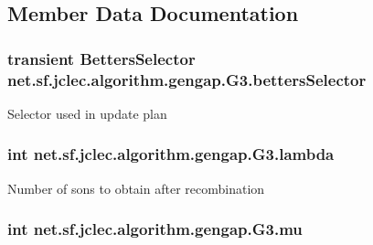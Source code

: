 \subsection{Member Data Documentation}
\hypertarget{classnet_1_1sf_1_1jclec_1_1algorithm_1_1gengap_1_1_g3_aeec51201a8db026697691e93b2c8b026}{
\subsubsection[{betters\-Selector}]{\setlength{\rightskip}{0pt plus 5cm}transient {\bf Betters\-Selector} net.\-sf.\-jclec.\-algorithm.\-gengap.\-G3.\-betters\-Selector\hspace{0.3cm}{\ttfamily [protected]}}}\label{classnet_1_1sf_1_1jclec_1_1algorithm_1_1gengap_1_1_g3_aeec51201a8db026697691e93b2c8b026}
Selector used in update plan \hypertarget{classnet_1_1sf_1_1jclec_1_1algorithm_1_1gengap_1_1_g3_ad0bae64a81015d9bfd89a37a1273ae05}{
\subsubsection[{lambda}]{\setlength{\rightskip}{0pt plus 5cm}int net.\-sf.\-jclec.\-algorithm.\-gengap.\-G3.\-lambda\hspace{0.3cm}{\ttfamily [protected]}}}\label{classnet_1_1sf_1_1jclec_1_1algorithm_1_1gengap_1_1_g3_ad0bae64a81015d9bfd89a37a1273ae05}
Number of sons to obtain after recombination \hypertarget{classnet_1_1sf_1_1jclec_1_1algorithm_1_1gengap_1_1_g3_aa4ddf4a074688412a3fe669aac3283a1}{
\subsubsection[{mu}]{\setlength{\rightskip}{0pt plus 5cm}int net.\-sf.\-jclec.\-algorithm.\-gengap.\-G3.\-mu\hspace{0.3cm}{\ttfamily [protected]}}}\label{classnet_1_1sf_1_1jclec_1_1algorithm_1_1gengap_1_1_g3_aa4ddf4a074688412a3fe669aac3283a1}
